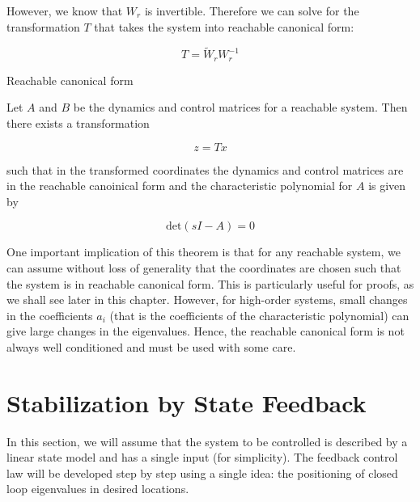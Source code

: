 However, we know that $W_r$ is invertible. Therefore we can solve for the transformation $T$ that takes the system into reachable canonical form:

\begin{equation}
T = \tilde{W}_r W_{r}^{-1}
\end{equation}


\begin{framed}
\theoremstyle{theorem}
\begin{theorem}{Reachable canonical form}

Let $A$ and $B$ be the dynamics and control matrices for a reachable system. Then there exists a transformation

\begin{equation}
z = Tx \nonumber
\end{equation}

such that in the transformed coordinates  the dynamics and control matrices are in the reachable 
canoinical form and the characteristic polynomial for $A$ is given by

\begin{equation}
\text{det}(sI-A) = 0 \nonumber
\end{equation}

\end{theorem}
\end{framed}

One important implication of this theorem is that for any reachable system, we
can assume without loss of generality that the coordinates are chosen such that the
system is in reachable canonical form. This is particularly useful for proofs, as we
shall see later in this chapter. However, for high-order systems, small changes in
the coefficients $a_i$ (that is the coefficients of the characteristic polynomial) can give large changes in the eigenvalues. Hence, the reachable canonical form is not always well conditioned and must be used with some care.


\section{Stabilization by State Feedback}

In this section, we will assume that the
system to be controlled is described by a linear state model and has a single input
(for simplicity). The feedback control law will be developed step by step using a
single idea: the positioning of closed loop eigenvalues in desired locations.

